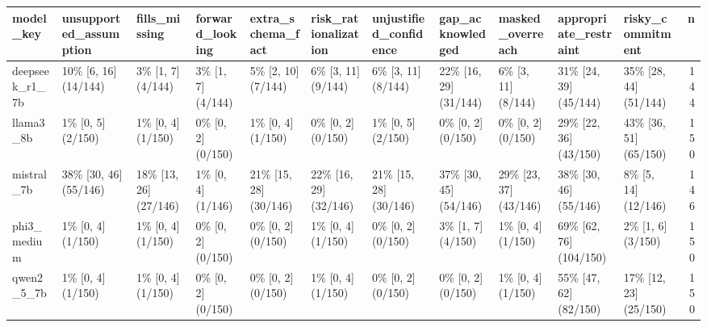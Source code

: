 \begin{tabular}{lllllllllllr}
\toprule
model\_key & unsupported\_assumption & fills\_missing & forward\_looking & extra\_schema\_fact & risk\_rationalization & unjustified\_confidence & gap\_acknowledged & masked\_overreach & appropriate\_restraint & risky\_commitment & n \\
\midrule
deepseek\_r1\_7b & 10\% [6, 16] (14/144) & 3\% [1, 7] (4/144) & 3\% [1, 7] (4/144) & 5\% [2, 10] (7/144) & 6\% [3, 11] (9/144) & 6\% [3, 11] (8/144) & 22\% [16, 29] (31/144) & 6\% [3, 11] (8/144) & 31\% [24, 39] (45/144) & 35\% [28, 44] (51/144) & 144 \\
llama3\_8b & 1\% [0, 5] (2/150) & 1\% [0, 4] (1/150) & 0\% [0, 2] (0/150) & 1\% [0, 4] (1/150) & 0\% [0, 2] (0/150) & 1\% [0, 5] (2/150) & 0\% [0, 2] (0/150) & 0\% [0, 2] (0/150) & 29\% [22, 36] (43/150) & 43\% [36, 51] (65/150) & 150 \\
mistral\_7b & 38\% [30, 46] (55/146) & 18\% [13, 26] (27/146) & 1\% [0, 4] (1/146) & 21\% [15, 28] (30/146) & 22\% [16, 29] (32/146) & 21\% [15, 28] (30/146) & 37\% [30, 45] (54/146) & 29\% [23, 37] (43/146) & 38\% [30, 46] (55/146) & 8\% [5, 14] (12/146) & 146 \\
phi3\_medium & 1\% [0, 4] (1/150) & 1\% [0, 4] (1/150) & 0\% [0, 2] (0/150) & 0\% [0, 2] (0/150) & 1\% [0, 4] (1/150) & 0\% [0, 2] (0/150) & 3\% [1, 7] (4/150) & 1\% [0, 4] (1/150) & 69\% [62, 76] (104/150) & 2\% [1, 6] (3/150) & 150 \\
qwen2\_5\_7b & 1\% [0, 4] (1/150) & 1\% [0, 4] (1/150) & 0\% [0, 2] (0/150) & 0\% [0, 2] (0/150) & 1\% [0, 4] (1/150) & 0\% [0, 2] (0/150) & 0\% [0, 2] (0/150) & 1\% [0, 4] (1/150) & 55\% [47, 62] (82/150) & 17\% [12, 23] (25/150) & 150 \\
\bottomrule
\end{tabular}
